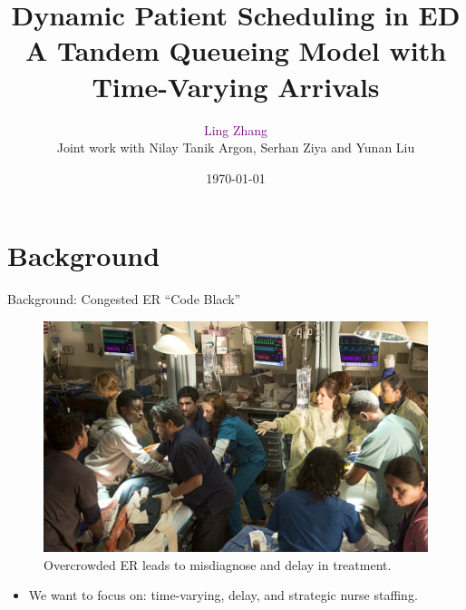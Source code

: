 \documentclass[smaller ,table,usenames,dvipsnames]{beamer}
\newcommand{\?}{\stackrel{?}{=}}
\begin{document}


\title[Dynamic Patient Scheduling in ED]{\Large{Dynamic Patient Scheduling in ED\\ A Tandem Queueing Model with Time-Varying Arrivals}}
\author[Ling Zhang]{\textcolor{purple}{\large Ling Zhang}\\ Joint work with Nilay Tanik Argon, Serhan Ziya and Yunan Liu}


\date{\today}


\frame{
    \titlepage
}

\section{Background}
\begin{frame}{Background: Congested ER ``Code Black''}
\begin{figure}[htp]
	\includegraphics[width=0.85\linewidth]{./Figures/ER_codeblack}
	\caption*{Overcrowded ER leads to misdiagnose and delay in treatment. }
\end{figure}
\vspace{-0.1in}
\begin{itemize}
    \item We want to focus on: time-varying, delay, and strategic nurse staffing.
\end{itemize}
\end{frame}
\end{document}
